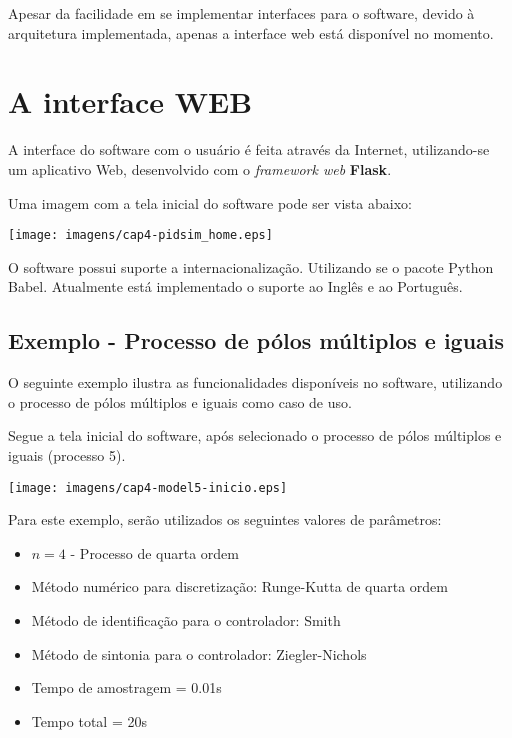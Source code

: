             Apesar da facilidade em se implementar interfaces para o software, devido à arquitetura
            implementada, apenas a interface web está disponível no momento.

\section{A interface WEB}

    A interface do software com o usuário é feita através da Internet, utilizando-se um aplicativo Web,
    desenvolvido com o \textit{framework web} \textbf{Flask}.

    Uma imagem com a tela inicial do software pode ser vista abaixo:
    
    \begin{center}
        \texttt{[image: imagens/cap4-pidsim\_home.eps]}
    \end{center}

    O software possui suporte a internacionalização. Utilizando se o pacote Python Babel. Atualmente está
    implementado o suporte ao Inglês e ao Português.
    
    \subsection{Exemplo - Processo de pólos múltiplos e iguais}
    
        O seguinte exemplo ilustra as funcionalidades disponíveis no software,
        utilizando o processo de pólos múltiplos e iguais como caso de uso.
        
        Segue a tela inicial do software, após selecionado o processo de
        pólos múltiplos e iguais (processo 5).
        
        \begin{center}
            \texttt{[image: imagens/cap4-model5-inicio.eps]}
        \end{center}
        
        Para este exemplo, serão utilizados os seguintes valores de parâmetros:
        
        \begin{itemize}
            \item $n = 4$ - Processo de quarta ordem
            \item Método numérico para discretização: Runge-Kutta de quarta ordem
            \item Método de identificação para o controlador: Smith
            \item Método de sintonia para o controlador: Ziegler-Nichols
            \item Tempo de amostragem = 0.01s
            \item Tempo total = 20s
        \end{itemize}
        

